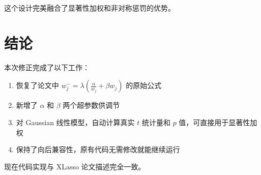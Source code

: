 \documentclass[12pt,a4paper]{article}
\begin{document}
这个设计完美融合了显著性加权和非对称惩罚的优势。

\section{结论}

本次修正完成了以下工作：
\begin{enumerate}
\item 恢复了论文中 $w_j^- = \lambda (\frac{\alpha}{w_j} + \beta w_j)$ 的原始公式
\item 新增了 $\alpha$ 和 $\beta$ 两个超参数供调节
\item 对 Gaussian 线性模型，自动计算真实 $t$ 统计量和 $p$ 值，可直接用于显著性加权
\item 保持了向后兼容性，原有代码无需修改就能继续运行
\end{enumerate}

现在代码实现与 XLasso 论文描述完全一致。
\end{document}
